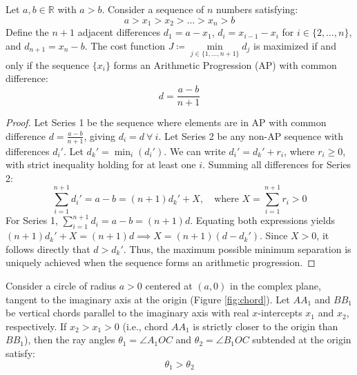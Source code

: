 \begin{proposition}\label{prop:ch_GC_AP_optimization}
\leavevmode\par\noindent
Let $a, b \in \mathbb{R}$ with $a > b$. Consider a sequence of $n$ numbers satisfying:
\begin{equation}\label{eq:ch_GC_sequence}
	a > x_1 > x_2 > \dots > x_n > b
\end{equation}
Define the $n+1$ adjacent differences $d_1 = a - x_1$, $d_i = x_{i-1} - x_i$ for $i \in \{2, \dots, n\}$, and $d_{n+1} = x_n - b$. The cost function $J \coloneqq \min\limits_{j \in \{1, \dots, n+1\}} d_j$ is maximized if and only if the sequence $\{x_i\}$ forms an Arithmetic Progression (AP) with common difference:
\begin{equation}\label{eq:ch_GC_AP_diff}
	d = \frac{a - b}{n+1}
\end{equation}
\end{proposition}
\begin{proof}
Let Series 1 be the sequence where elements are in AP with common difference $d = \frac{a-b}{n+1}$, giving $d_i = d ~\forall~ i$. Let Series 2 be any non-AP sequence with differences $d_i'$. Let $d_k' = \min_i (d_i')$. We can write $d_i' = d_k' + r_i$, where $r_i \ge 0$, with strict inequality holding for at least one $i$.
Summing all differences for Series 2:
\begin{equation*}
	\sum_{i=1}^{n+1} d_i' = a - b = (n+1)d_k' + X, \quad \text{where } X = \sum_{i=1}^{n+1} r_i > 0
\end{equation*}
For Series 1, $\sum_{i=1}^{n+1} d_i = a - b = (n+1)d$. Equating both expressions yields $(n+1)d_k' + X = (n+1)d \implies X = (n+1)(d - d_k')$. Since $X > 0$, it follows directly that $d > d_k'$. Thus, the maximum possible minimum separation is uniquely achieved when the sequence forms an arithmetic progression.
\end{proof}
\begin{proposition}\label{prop:ch_GC_chord_geometry}
\leavevmode\par\noindent
Consider a circle of radius $a > 0$ centered at $(a,0)$ in the complex plane, tangent to the imaginary axis at the origin (Figure \ref{fig:chord}). Let $AA_1$ and $BB_1$ be vertical chords parallel to the imaginary axis with real $x$-intercepts $x_1$ and $x_2$, respectively. If $x_2 > x_1 > 0$ (i.e., chord $AA_1$ is strictly closer to the origin than $BB_1$), then the ray angles $\theta_1 = \angle A_1 O C$ and $\theta_2 = \angle B_1 O C$ subtended at the origin satisfy:
\begin{equation}
	\theta_1 > \theta_2
\end{equation}
\end{proposition}

